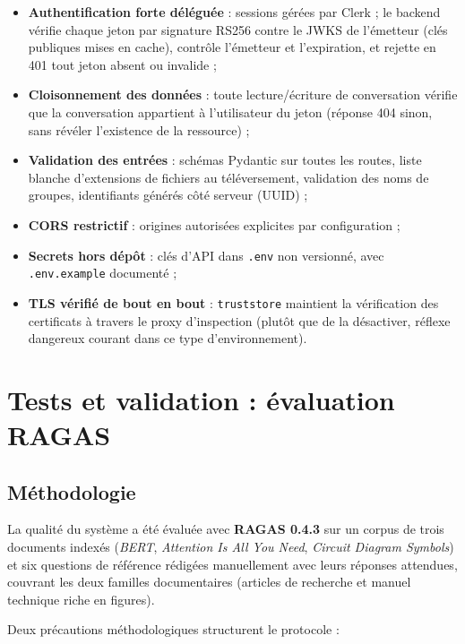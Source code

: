 \begin{itemize}
  \item \textbf{Authentification forte déléguée} : sessions gérées par Clerk ; le backend
        vérifie chaque jeton par signature RS256 contre le JWKS de l'émetteur (clés
        publiques mises en cache), contrôle l'émetteur et l'expiration, et rejette en 401
        tout jeton absent ou invalide ;
  \item \textbf{Cloisonnement des données} : toute lecture/écriture de conversation vérifie
        que la conversation appartient à l'utilisateur du jeton (réponse 404 sinon, sans
        révéler l'existence de la ressource) ;
  \item \textbf{Validation des entrées} : schémas Pydantic sur toutes les routes, liste
        blanche d'extensions de fichiers au téléversement, validation des noms de groupes,
        identifiants générés côté serveur (UUID) ;
  \item \textbf{CORS restrictif} : origines autorisées explicites par configuration ;
  \item \textbf{Secrets hors dépôt} : clés d'API dans \texttt{.env} non versionné, avec
        \texttt{.env.example} documenté ;
  \item \textbf{TLS vérifié de bout en bout} : \texttt{truststore} maintient la
        vérification des certificats à travers le proxy d'inspection (plutôt que de la
        désactiver, réflexe dangereux courant dans ce type d'environnement).
\end{itemize}

\section{Tests et validation : évaluation RAGAS}
\label{sec:evaluation}

\subsection{Méthodologie}

La qualité du système a été évaluée avec \textbf{RAGAS 0.4.3} \cite{es2023ragas} sur un
corpus de trois documents indexés (\emph{BERT}, \emph{Attention Is All You Need},
\emph{Circuit Diagram Symbols}) et six questions de référence rédigées manuellement avec
leurs réponses attendues, couvrant les deux familles documentaires (articles de recherche
et manuel technique riche en figures).

Deux précautions méthodologiques structurent le protocole :

